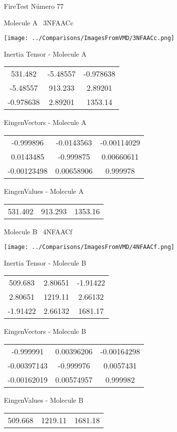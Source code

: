 \vtab[-3cm]
\begin{center}
{\large FireTest \tab Número 77}
\end{center}
\begin{multicols}{2}
\begin{center}

Molecule A \
3NFAACc

\texttt{[image: ../Comparisons/ImagesFromVMD/3NFAACc.png]}

Inertia Tensor - Molecule A \\
\begin{tabular}{|c c c|}
531.482	 & 	-5.48557	 & 	-0.978638	 \\
-5.48557	 & 	913.233	 & 	2.89201	 \\
-0.978638	 & 	2.89201	 & 	1353.14
\end{tabular}

\vtab
 EingenVectors - Molecule A     \\
\begin{tabular}{|c c c|}
-0.999896	 & 	-0.0143563	 & 	-0.00114029	 \\
0.0143485	 & 	-0.999875	 & 	0.00660611	 \\
-0.00123498	 & 	0.00658906	 & 	0.999978
\end{tabular}

\vtab
 EingenValues - Molecule A     \\
\begin{tabular}{|c c c|}
531.402	 & 	913.293	 & 	1353.16	 \\
\end{tabular}
\columnbreak

Molecule B \
4NFAACf

\texttt{[image: ../Comparisons/ImagesFromVMD/4NFAACf.png]}

Inertia Tensor - Molecule B \\
\begin{tabular}{|c c c|}
509.683	 & 	2.80651	 & 	-1.91422	 \\
2.80651	 & 	1219.11	 & 	2.66132	 \\
-1.91422	 & 	2.66132	 & 	1681.17
\end{tabular}

\vtab
 EingenVectors - Molecule B     \\
\begin{tabular}{|c c c|}
-0.999991	 & 	0.00396206	 & 	-0.00164298	 \\
-0.00397143	 & 	-0.999976	 & 	0.0057431	 \\
-0.00162019	 & 	0.00574957	 & 	0.999982
\end{tabular}

\vtab
 EingenValues - Molecule B     \\
\begin{tabular}{|c c c|}
509.668	 & 	1219.11	 & 	1681.18	 \\
\end{tabular}

\end{center}
\end{multicols}

